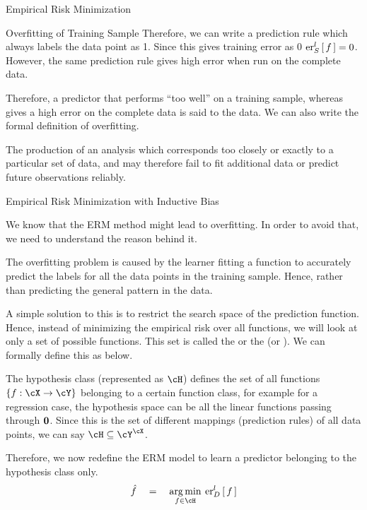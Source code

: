 \documentclass{article}
\begin{document}
\begin{ssection}{Empirical Risk Minimization}
\begin{ssubsection}{Overfitting of Training Sample}
		Therefore, we can write a prediction rule which always labels the data point as 1. Since this gives training error as 0  $\err[_S^l]{f} = 0$. However, the same prediction rule gives high error when run on the complete data. \br

		Therefore, a predictor that performs ``too well'' on a training sample, whereas gives a high error on the complete data is said to  the data. We can also write the formal definition of overfitting.

		\begin{definition}
			The production of an analysis which corresponds too closely or exactly to a particular set of data, and may therefore fail to fit additional data or predict future observations reliably.
		\end{definition}

	\end{ssubsection}

	\begin{ssubsection}{Empirical Risk Minimization with Inductive Bias}

		We know that the ERM method might lead to overfitting. In order to avoid that, we need to understand the reason behind it. \br

		The overfitting problem is caused by the learner fitting a function to accurately predict the labels for all the data points in the training sample. Hence, rather than predicting the general pattern in the data. \br

		A simple solution to this is to restrict the search space of the prediction function. Hence, instead of minimizing the empirical risk over all functions, we will look at only a set of possible functions. This set is called the  or the  (or ). We can formally define this as below.

		\begin{definition}
			The hypothesis class (represented as $\cH$) defines the set of all functions $\set{f : \cX \ra \cY}$ belonging to a certain function class, for example for a regression case, the hypothesis space can be all the linear functions passing through $\vzero$. Since this is the set of different mappings (prediction rules) of all data points, we can say $\cH \subseteq \cY^\cX$.
		\end{definition}

		Therefore, we now redefine the ERM model to learn a predictor belonging to the hypothesis class only.
		\begin{align*}
			\hat{f}	\eq	\argmin{f \in \cH} \err[_D^l]{f}
		\end{align*}


\end{ssubsection}
\end{ssection}
\end{document}
